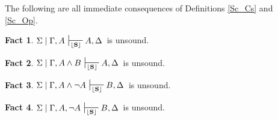 \documentclass{article}                     %
\theoremstyle{theorem}
\theoremstyle{corollary}
\theoremstyle{lemma}
\theoremstyle{definition}
\theoremstyle{remark}
\theoremstyle{definition}
\theoremstyle{notation}
\theoremstyle{definition}
\theoremstyle{proposition}
\theoremstyle{definition}
\newtheorem{fact}{Fact}
\begin{document}
\vspace{3mm}

The following are all immediate consequences of Definitions \ref{Sc_Cs} and \ref{Sc_Op}.


\begin{fact}
$\Sigma\mid\Gamma,A \,\sststile{\lfloor\mathbf{S}\rfloor}{} A,\Delta\,$ is unsound.
\end{fact}

\begin{fact}
$\Sigma\mid\Gamma,A\wedge B \,\sststile{\lfloor\mathbf{S}\rfloor}{} A,\Delta\,$ is unsound.
\end{fact}

\begin{fact}
$\Sigma\mid\Gamma, A\wedge\neg A \,\sststile{\lfloor\mathbf{S}\rfloor}{} B,\Delta\,$ is unsound.
\end{fact}

\begin{fact}
$\Sigma\mid\Gamma, A, \neg A \,\sststile{\lfloor\mathbf{S}\rfloor}{} B,\Delta\,$ is unsound.
\end{fact}
\end{document}

